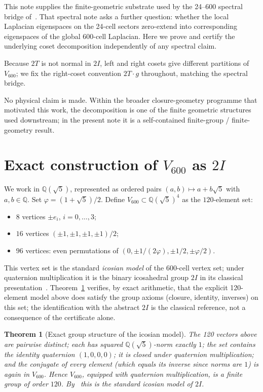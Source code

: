 \documentclass[11pt]{article}
\newcommand{\Vsix}{V_{600}}
\newcommand{\Phigold}{\varphi}
\newcommand{\twoI}{2I}
\newcommand{\twoT}{2T}
\theoremstyle{plain}
\newtheorem{theorem}{Theorem}
\theoremstyle{definition}
\begin{document}
This note supplies the finite-geometric substrate used by the
24--600 spectral bridge of~\cite{Smart24600Bridge}.  That spectral
note asks a further question: whether the local Laplacian
eigenspaces on the 24-cell sectors zero-extend into corresponding
eigenspaces of the global 600-cell Laplacian.  Here we prove and
certify the underlying coset decomposition independently of any
spectral claim.

Because $\twoT$ is not normal in $\twoI$, left and right cosets
give different partitions of $\Vsix$; we fix the right-coset
convention $\twoT\!\cdot\! g$ throughout, matching the spectral
bridge.

No physical claim is made.  Within the broader closure-geometry
programme that motivated this work, the decomposition is one of the
finite geometric structures used downstream; in the present note it
is a self-contained finite-group / finite-geometry result.

\section{Exact construction of $\Vsix$ as $\twoI$}\label{sec:v600}

We work in $\mathbb{Q}(\sqrt 5)$, represented as ordered pairs
$(a, b) \mapsto a + b\sqrt 5$ with $a, b\in\mathbb{Q}$.  Set
$\Phigold = (1+\sqrt 5)/2$.  Define $\Vsix\subset\mathbb{Q}(\sqrt 5)^4$ as
the $120$-element set:
\begin{itemize}
  \item $8$ vertices $\pm e_i$, $i = 0, \dots, 3$;
  \item $16$ vertices $(\pm 1, \pm 1, \pm 1, \pm 1)/2$;
  \item $96$ vertices: even permutations of
        $(0, \pm 1/(2\Phigold), \pm 1/2, \pm \Phigold/2)$.
\end{itemize}
This vertex set is the standard \emph{icosian model} of the 600-cell
vertex set; under quaternion multiplication it is the binary
icosahedral group $\twoI$ in its classical
presentation~\cite{Coxeter1973,ConwaySloane1999}.  Theorem~\ref{thm:v600}
verifies, by exact arithmetic, that the explicit 120-element model
above does satisfy the group axioms (closure, identity, inverses) on
this set; the identification with the abstract $\twoI$ is the
classical reference, not a consequence of the certificate alone.

\begin{theorem}[Exact group structure of the icosian model]\label{thm:v600}
The 120 vectors above are pairwise distinct; each has squared
$\mathbb{Q}(\sqrt 5)$-norm exactly $1$; the set contains the
identity quaternion $(1, 0, 0, 0)$; it is closed under quaternion
multiplication; and the conjugate of every element (which equals its
inverse since norms are $1$) is again in $\Vsix$.  Hence $\Vsix$,
equipped with quaternion multiplication, is a finite group of order
$120$.  By~\cite{Coxeter1973,ConwaySloane1999} this is the standard
icosian model of $\twoI$.
\end{theorem}
\end{document}
